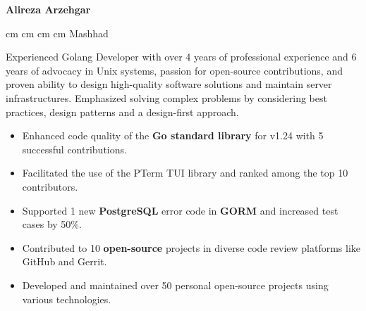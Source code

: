 \documentclass{engineercv}
\begin{document}
\begin{center}
  \textbf{\fontsize{24 pt}{24 pt}\selectfont Alireza Arzehgar}

  \vspace{0.2 cm}

  \scriptsize
  \mbox{}
   cm
  \mbox{}
   cm
  \mbox{}
   cm
  \mbox{}
   cm
  \mbox{{\color{black}\footnotesize\faMapMarker*}\hspace*{0.13cm}Mashhad}
\end{center}


Experienced Golang Developer with over 4 years of professional experience and 6 years of advocacy in Unix systems,
passion for open-source contributions, and proven ability to design high-quality software solutions and
maintain server infrastructures. Emphasized solving complex problems by considering best practices,
design patterns and a design-first approach.

\begin{itemize}
  \item Enhanced code quality of the \textbf{Go standard library} for v1.24 with 5 successful contributions.
  \item Facilitated the use of the PTerm TUI library and ranked among the top 10 contributors.
  \item Supported 1 new \textbf{PostgreSQL} error code in \textbf{GORM} and increased test cases by 50\%.
  \item Contributed to 10 \textbf{open-source} projects in diverse code review platforms like GitHub and Gerrit.
  \item Developed and maintained over 50 personal open-source projects using various technologies.
\end{itemize}
\end{document}
